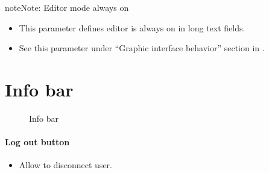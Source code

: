 \documentclass[letterpaper,10pt,english]{sphinxmanual}
\begin{document}
\begin{notice}{note}{Note:}
Editor mode always on
\begin{itemize}
\item {} 
This parameter defines editor is always on in long text fields.

\item {} 
See this parameter under ``Graphic interface behavior'' section in {\hyperref[UserParameter:user-parameters-label]{\emph{}}}.

\end{itemize}
\end{notice}
\newpage

\section{Info bar}
\label{Gui:info-bar}\begin{figure}[htbp]
\centering
\capstart

\caption{Info bar}\end{figure}
\begin{figure}[htbp]
\centering

\end{figure}
\paragraph{Log out button}
\begin{itemize}
\item {} 
Allow to disconnect user.

\end{itemize}
\end{document}
